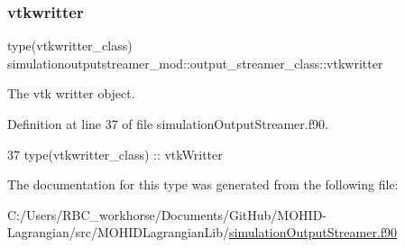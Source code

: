 \subsubsection{\texorpdfstring{vtkwritter}{vtkwritter}}
{\footnotesize\ttfamily type(vtkwritter\+\_\+class) simulationoutputstreamer\+\_\+mod\+::output\+\_\+streamer\+\_\+class\+::vtkwritter\hspace{0.3cm}{\ttfamily [private]}}



The vtk writter object. 



Definition at line 37 of file simulation\+Output\+Streamer.\+f90.


\begin{DoxyCode}
37         \textcolor{keywordtype}{type}(vtkwritter\_class) :: vtkWritter
\end{DoxyCode}


The documentation for this type was generated from the following file\+:\begin{DoxyCompactItemize}
\item 
C\+:/\+Users/\+R\+B\+C\+\_\+workhorse/\+Documents/\+Git\+Hub/\+M\+O\+H\+I\+D-\/\+Lagrangian/src/\+M\+O\+H\+I\+D\+Lagrangian\+Lib/\mbox{\hyperlink{simulation_output_streamer_8f90}{simulation\+Output\+Streamer.\+f90}}\end{DoxyCompactItemize}
